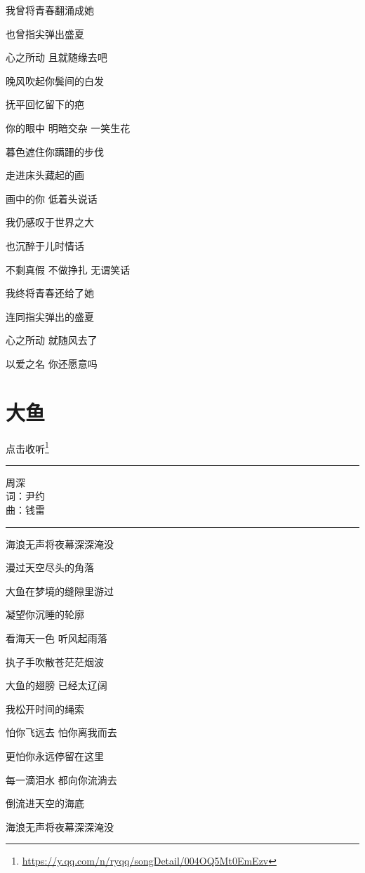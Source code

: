 \documentclass[]{ctexbook}
\renewcommand{\href}[2]{#2\footnote{\url{#1}}}
\begin{document}
我曾将青春翻涌成她

也曾指尖弹出盛夏

心之所动 且就随缘去吧

晚风吹起你鬓间的白发

抚平回忆留下的疤

你的眼中 明暗交杂 一笑生花

暮色遮住你蹒跚的步伐

走进床头藏起的画

画中的你 低着头说话

我仍感叹于世界之大

也沉醉于儿时情话

不剩真假 不做挣扎 无谓笑话

我终将青春还给了她

连同指尖弹出的盛夏

心之所动 就随风去了

以爱之名 你还愿意吗

\section*{大鱼}\label{big-fish}


\href{https://y.qq.com/n/ryqq/songDetail/004OQ5Mt0EmEzv}{点击收听}

\begin{center}\rule{0.5\linewidth}{0.5pt}\end{center}

周深\\
词：尹约\\
曲：钱雷

\begin{center}\rule{0.5\linewidth}{0.5pt}\end{center}

海浪无声将夜幕深深淹没

漫过天空尽头的角落

大鱼在梦境的缝隙里游过

凝望你沉睡的轮廓

看海天一色 听风起雨落

执子手吹散苍茫茫烟波

大鱼的翅膀 已经太辽阔

我松开时间的绳索

怕你飞远去 怕你离我而去

更怕你永远停留在这里

每一滴泪水 都向你流淌去

倒流进天空的海底

海浪无声将夜幕深深淹没
\end{document}
